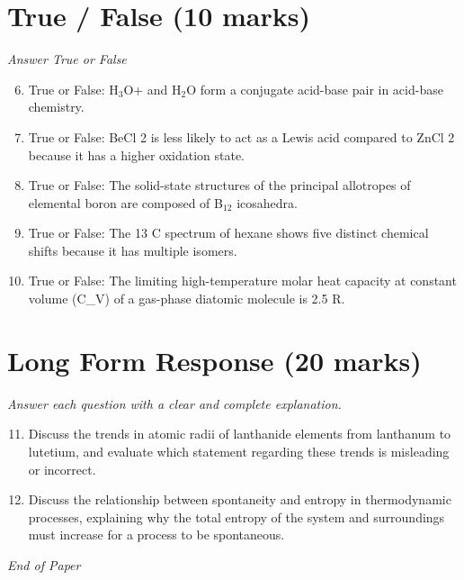 \documentclass[12pt]{article}
\begin{document}
\section*{True / False (10 marks)}
\textit{Answer True or False}
\begin{enumerate}[label=\arabic*.]
\setcounter{enumi}{5}
\item True or False: H$_{3}$O+ and H$_{2}$O form a conjugate acid-base pair in acid-base chemistry.
\item True or False: BeCl 2 is less likely to act as a Lewis acid compared to ZnCl 2 because it has a higher oxidation state.
\item True or False: The solid-state structures of the principal allotropes of elemental boron are composed of B$_{12}$ icosahedra.
\item True or False: The 13 C spectrum of hexane shows five distinct chemical shifts because it has multiple isomers.
\item True or False: The limiting high-temperature molar heat capacity at constant volume (C\_V) of a gas-phase diatomic molecule is 2.5 R.
\end{enumerate}

\section*{Long Form Response (20 marks)}
\textit{Answer each question with a clear and complete explanation.}
\begin{enumerate}[label=\arabic*.]
\setcounter{enumi}{10}
\item Discuss the trends in atomic radii of lanthanide elements from lanthanum to lutetium, and evaluate which statement regarding these trends is misleading or incorrect.
\item Discuss the relationship between spontaneity and entropy in thermodynamic processes, explaining why the total entropy of the system and surroundings must increase for a process to be spontaneous.
\end{enumerate}

\vfill
\noindent\textit{End of Paper}
\end{document}
